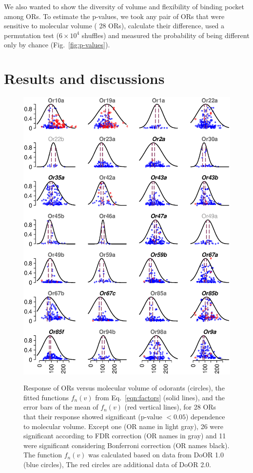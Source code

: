 \documentclass[11pt]{paper} %
\newcommand{\numberofreceptors}{ 28 }
\newcommand{\bonferroni}{ 11 }
\newcommand{\fdr}{ 26 }
\begin{document}
We also wanted to show the diversity of volume and flexibility of binding pocket among ORs.
To estimate the p-values, 
we took any pair of ORs that were sensitive to molecular volume (\numberofreceptors ORs),
calculate their difference, 
used a permutation test ($6\times10^4$ shuffles) and measured the probability of being different only by chance (Fig.~\ref{fig:p-values}).


\section*{Results and discussions}
\begin{figure}
	\centering
		\includegraphics[width=0.8 \textwidth]{vol-res-}
		\label{fig:vol-res:all}		
	\caption{Response of ORs  versus molecular volume of odorants (circles),  
			the fitted functions $f_n(v)$ from Eq.~\ref{eqn:factors} (solid lines), 
			and the error bars of the mean of $f_n(v)$ (red vertical lines), 
			for \numberofreceptors ORs that their response showed significant (p-value $<0.05$) dependence to molecular volume. 
			Except one (OR name in light gray), \fdr were significant according to FDR correction (OR names in gray) and 
			\bonferroni were significant considering Bonferroni correction (OR names black).
			The function $f_n(v)$ was calculated based on data from DoOR 1.0 (blue circles), 
			The red circles are additional data of DoOR 2.0. 
		}
	\label{fig:vol-res}
\end{figure}
\end{document}
